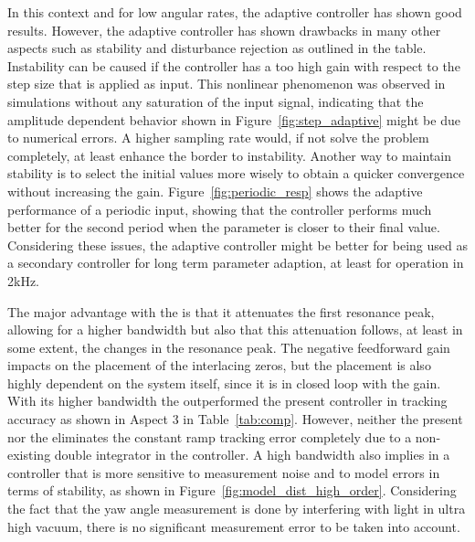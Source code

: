In this context and for low angular rates, the adaptive controller has shown good results. However, the adaptive controller has shown drawbacks in many other aspects such as stability and disturbance rejection as outlined in the table. Instability can be caused if the controller has a too high gain with respect to the step size that is applied as input. This nonlinear phenomenon was observed in simulations without any saturation of the input signal, indicating that the amplitude dependent behavior shown in Figure~\ref{fig:step_adaptive} might be due to numerical errors. A higher sampling rate would, if not solve the problem completely, at least enhance the border to instability. Another way to maintain stability is to select the initial values more wisely to obtain a quicker convergence without increasing the gain. Figure~\ref{fig:periodic_resp} shows the adaptive performance of a periodic input, showing that the controller performs much better for the second period when the parameter is closer to their final value. Considering these issues, the adaptive controller might be better for being used as a secondary controller for long term parameter adaption, at least for operation in 2kHz.

The major advantage with the \abbrIRC is that it attenuates the first resonance peak, allowing for a higher bandwidth but also that this attenuation follows, at least in some extent, the changes in the resonance peak. The negative feedforward gain impacts on the placement of the interlacing zeros, but the placement is also highly dependent on the system itself, since it is in closed loop with the gain. With its higher bandwidth the \abbrIRC outperformed the present controller in tracking accuracy as shown in Aspect 3 in Table~\ref{tab:comp}. However, neither the present nor the \abbrIRC eliminates the constant ramp tracking error completely due to a non-existing double integrator in the controller. A high bandwidth also implies in a controller that is more sensitive to measurement noise and to model errors in terms of stability, as shown in Figure~\ref{fig:model_dist_high_order}. Considering the fact that the yaw angle measurement is done by interfering with light in ultra high vacuum, there is no significant measurement error to be taken into account.

